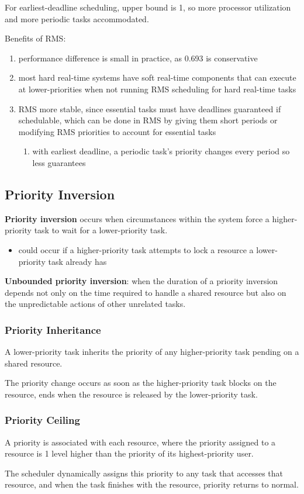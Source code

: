 \documentclass[11pt]{article}
\begin{document}
For earliest-deadline scheduling, upper bound is 1, so more processor utilization and more periodic tasks accommodated.

Benefits of RMS:
\begin{enumerate}
\item performance difference is small in practice, as 0.693 is conservative
\item most hard real-time systems have soft real-time components that can execute at lower-priorities when not running
RMS scheduling for hard real-time tasks
\item RMS more stable, since essential tasks must have deadlines guaranteed if schedulable, which can be done in RMS by
giving them short periods or modifying RMS priorities to account for essential tasks
\begin{enumerate}
\item with earliest deadline, a periodic task's priority changes every period so less guarantees
\end{enumerate}
\end{enumerate}
\subsection{Priority Inversion}
\label{sec:org9d0dd6f}
\textbf{Priority inversion} occurs when circumstances within the system force a higher-priority task to wait for
a lower-priority task.
\begin{itemize}
\item could occur if a higher-priority task attempts to lock a resource a lower-priority task already has
\end{itemize}

\textbf{Unbounded priority inversion}: when the duration of a priority inversion depends not only on the
time required to handle a shared resource but also on the unpredictable actions of other
unrelated tasks.
\subsubsection{Priority Inheritance}
\label{sec:org77cc164}
A lower-priority task inherits the priority of any higher-priority task pending on a shared resource.

The priority change occurs as soon as the higher-priority task blocks on the resource, ends when
the resource is released by the lower-priority task.
\subsubsection{Priority Ceiling}
\label{sec:org246135c}
A priority is associated with each resource, where the priority assigned to a resource is 1 level
higher than the priority of its highest-priority user.

The scheduler dynamically assigns this priority to any task that accesses that resource, and when
the task finishes with the resource, priority returns to normal.
\end{document}

